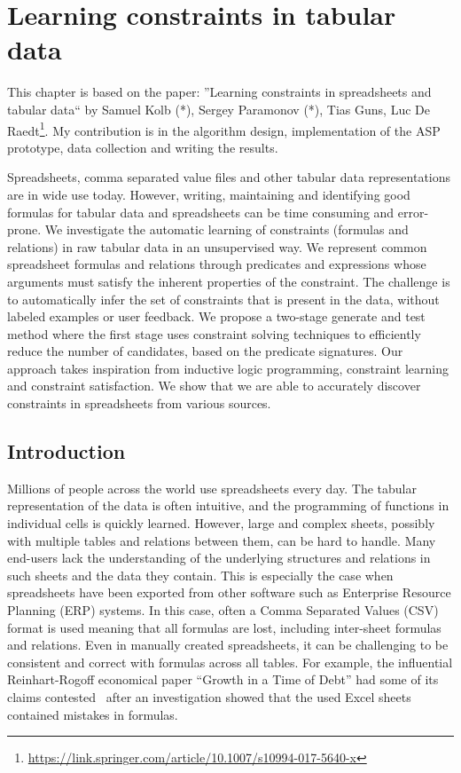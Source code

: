 \chapter{Learning constraints in tabular data}\label{ch:TaCLe}
This chapter is based on the paper: ''Learning constraints in spreadsheets and tabular data`` by Samuel Kolb (*), Sergey Paramonov (*), Tias Guns, Luc De Raedt\footnote{\url{https://link.springer.com/article/10.1007/s10994-017-5640-x}}. My contribution is in the algorithm design, implementation of the ASP prototype, data collection and writing the results.


Spreadsheets, comma separated value files and other tabular data representations are in wide use today.
However, writing, maintaining and identifying good formulas for tabular data and spreadsheets can be time consuming and error-prone.
We investigate the automatic learning of constraints (formulas and relations) in raw tabular data in an unsupervised way.
We represent common spreadsheet formulas and relations through predicates and expressions whose arguments must satisfy the inherent properties of the constraint. The challenge is to automatically infer the set of constraints that is present in the data, without labeled examples or user feedback. 
We propose a two-stage generate and test method where the first stage uses constraint solving techniques to efficiently reduce the number of candidates, based on the predicate signatures. 
Our approach takes inspiration from inductive logic programming, constraint learning and constraint satisfaction.
We show that we are able to accurately discover constraints in spreadsheets from various sources.

\section{Introduction}
Millions of people across the world use spreadsheets every day.
The tabular representation of the data is often intuitive, and the programming of functions in individual cells is quickly learned.
However, large and complex sheets, possibly with multiple tables and relations between them, can be hard to handle.
Many end-users lack the understanding of the underlying structures and relations in such sheets and the data they contain.
This is especially the case when spreadsheets have been exported from other software such as Enterprise Resource Planning (ERP) systems.
In this case, often a Comma Separated Values (CSV) format is used meaning that all formulas are lost, including inter-sheet formulas and relations.
Even in manually created spreadsheets, it can be challenging to be consistent and correct with formulas across all tables.
For example, the influential Reinhart-Rogoff economical paper ``Growth in a Time of Debt'' \parencite{growth_in_time_of_debt} had some of its claims contested~\parencite{flaw_excel} after an investigation showed that the used Excel sheets contained mistakes in formulas.

